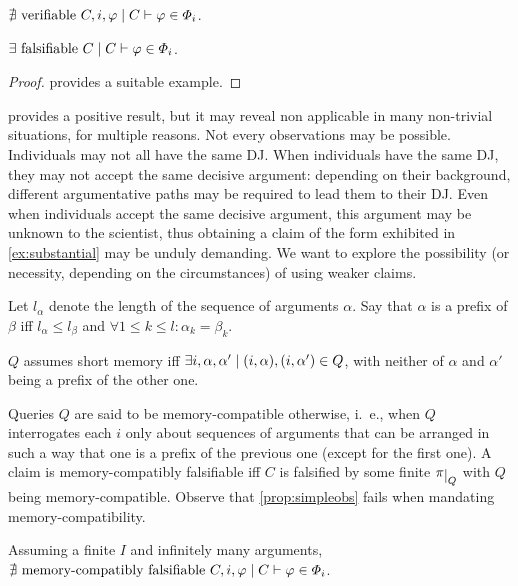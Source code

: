 \documentclass[version=3.21, pagesize, twoside=off, bibliography=totoc, DIV=calc, fontsize=12pt, a4paper]{scrartcl}
\begin{document}
\begin{proposition}
	$\nexists \text{ verifiable } C, i, \phi \suchthat C \vdash \phi \in \Phi_i$.
\end{proposition}

\begin{proposition}
	\label{prop:simpleobs}
	$\exists \text{ falsifiable } C \suchthat C \vdash \phi \in \Phi_i$.
\end{proposition}
\begin{proof}
	 provides a suitable example.
\end{proof}
 provides a positive result, but it may reveal non applicable in many non-trivial situations, for multiple reasons. Not every observations may be possible. Individuals may not all have the same DJ. When individuals have the same DJ, they may not accept the same decisive argument: depending on their background, different argumentative paths may be required to lead them to their DJ. Even when individuals accept the same decisive argument, this argument may be unknown to the scientist, thus obtaining a claim of the form exhibited in \cref{ex:substantial} may be unduly demanding. We want to explore the possibility (or necessity, depending on the circumstances) of using weaker claims.

Let $l_\alpha$ denote the length of the sequence of arguments $\alpha$. Say that $\alpha$ is a prefix of $\beta$ iff $l_\alpha ≤ l_\beta$ and $\forall 1 ≤ k ≤ l: \alpha_k = \beta_k$.

\begin{definition}
	$Q$ assumes short memory iff $\exists i, \alpha, \alpha' \suchthat (i, \alpha), (i, \alpha') \in Q$, with neither of $\alpha$ and $\alpha'$ being a prefix of the other one.
\end{definition}
Queries $Q$ are said to be memory-compatible otherwise, i.\ e., when $Q$ interrogates each $i$ only about sequences of arguments that can be arranged in such a way that one is a prefix of the previous one (except for the first one).
A claim is memory-compatibly falsifiable iff $C$ is falsified by some finite $\piQ$ with $Q$ being memory-compatible.
Observe that \cref{prop:simpleobs} fails when mandating memory-compatibility.
\begin{proposition}
	Assuming a finite $I$ and infinitely many arguments, $\nexists \text{ memory-compatibly falsifiable } C, i, \phi \suchthat C \vdash \phi \in \Phi_i$.
\end{proposition}
\end{document}
